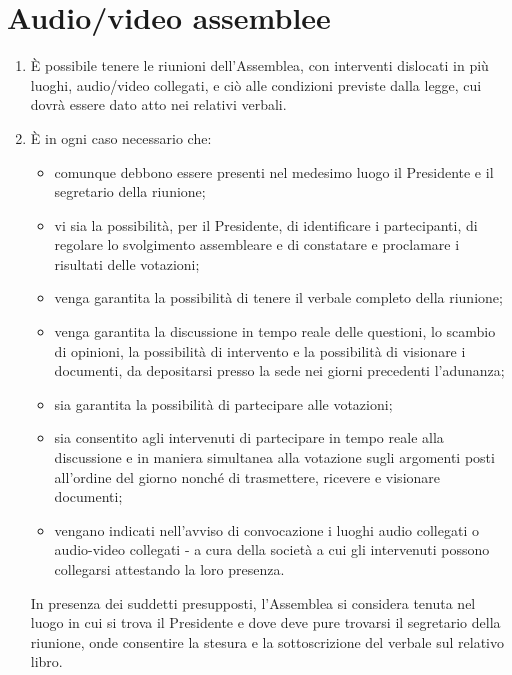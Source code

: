 \documentclass{djtsasddoc}
\begin{document}
	\section{Audio/video assemblee}
	\begin{enumerate}
		\item È possibile tenere le riunioni dell'Assemblea, con interventi dislocati in più luoghi, audio/video collegati, e ciò alle condizioni previste dalla legge, cui dovrà essere dato atto nei relativi verbali.
		\item È in ogni caso necessario che:
		\begin{itemize}
			\item comunque debbono essere presenti nel medesimo luogo il Presidente e il segretario della riunione;
			\item vi sia la possibilità, per il Presidente, di identificare i partecipanti, di regolare lo svolgimento assembleare e di constatare e proclamare i risultati delle votazioni;
			\item venga garantita la possibilità di tenere il verbale completo della riunione;
			\item venga garantita la discussione in tempo reale delle questioni, lo scambio di opinioni, la possibilità di intervento e la possibilità di visionare i documenti, da depositarsi presso la sede nei giorni precedenti l'adunanza;
			\item sia garantita la possibilità di partecipare alle votazioni;
			\item sia consentito agli intervenuti di partecipare in tempo reale alla discussione e in maniera simultanea alla votazione sugli argomenti posti all'ordine del giorno nonché di trasmettere, ricevere e visionare documenti;
			\item vengano indicati nell'avviso di convocazione i luoghi audio collegati o audio-video collegati - a cura della società a cui gli intervenuti possono collegarsi attestando la loro presenza.
		\end{itemize}
		In presenza dei suddetti presupposti, l'Assemblea si considera tenuta nel luogo in cui si trova il Presidente e dove deve pure trovarsi il segretario della riunione, onde consentire la stesura e la sottoscrizione del verbale sul relativo libro.
	\end{enumerate}
	
\end{document}
